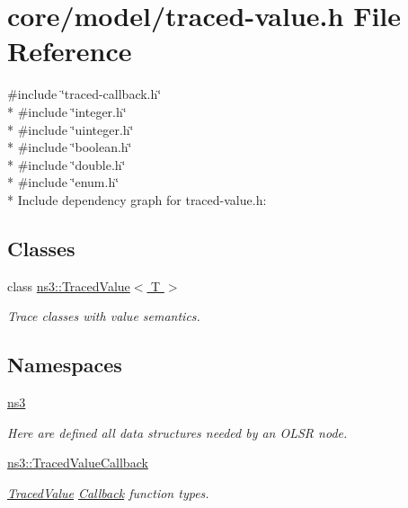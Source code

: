 \hypertarget{traced-value_8h}{}\section{core/model/traced-\/value.h File Reference}
\label{traced-value_8h}
{\ttfamily \#include \char`\"{}traced-\/callback.\+h\char`\"{}}\\*
{\ttfamily \#include \char`\"{}integer.\+h\char`\"{}}\\*
{\ttfamily \#include \char`\"{}uinteger.\+h\char`\"{}}\\*
{\ttfamily \#include \char`\"{}boolean.\+h\char`\"{}}\\*
{\ttfamily \#include \char`\"{}double.\+h\char`\"{}}\\*
{\ttfamily \#include \char`\"{}enum.\+h\char`\"{}}\\*
Include dependency graph for traced-\/value.h\+:
\subsection*{Classes}
\begin{DoxyCompactItemize}
\item 
class \hyperlink{classns3_1_1TracedValue}{ns3\+::\+Traced\+Value$<$ T $>$}
\begin{DoxyCompactList}\small\item\em Trace classes with value semantics. \end{DoxyCompactList}\end{DoxyCompactItemize}
\subsection*{Namespaces}
\begin{DoxyCompactItemize}
\item 
 \hyperlink{namespacens3}{ns3}
\begin{DoxyCompactList}\small\item\em Here are defined all data structures needed by an O\+L\+SR node. \end{DoxyCompactList}\item 
 \hyperlink{namespacens3_1_1TracedValueCallback}{ns3\+::\+Traced\+Value\+Callback}
\begin{DoxyCompactList}\small\item\em \hyperlink{classns3_1_1TracedValue}{Traced\+Value} \hyperlink{classns3_1_1Callback}{Callback} function types. \end{DoxyCompactList}\end{DoxyCompactItemize}
